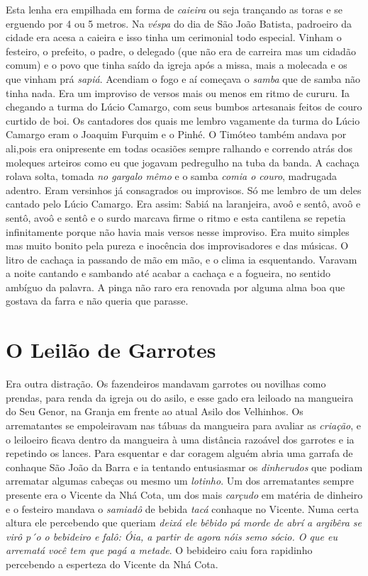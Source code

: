 \documentclass[12pt,brazil,]{book}
\begin{document}
Esta lenha era empilhada em forma de \emph{caieira} ou seja trançando as
toras e se erguendo por 4 ou 5 metros. Na \emph{véspa} do dia de São
João Batista, padroeiro da cidade era acesa a caieira e isso tinha um
cerimonial todo especial. Vinham o festeiro, o prefeito, o padre, o
delegado (que não era de carreira mas um cidadão comum) e o povo que
tinha saído da igreja após a missa, mais a molecada e os que vinham prá
\emph{sapiá}. Acendiam o fogo e aí começava o \emph{samba} que de samba
não tinha nada. Era um improviso de versos mais ou menos em ritmo de
cururu. Ia chegando a turma do Lúcio Camargo, com seus bumbos artesanais
feitos de couro curtido de boi. Os cantadores dos quais me lembro
vagamente da turma do Lúcio Camargo eram o Joaquim Furquim e o Pinhé. O
Timóteo também andava por ali,pois era onipresente em todas ocasiões
sempre ralhando e correndo atrás dos moleques arteiros como eu que
jogavam pedregulho na tuba da banda. A cachaça rolava solta, tomada
\emph{no gargalo mêmo} e o samba \emph{comia o couro}, madrugada
adentro. Eram versinhos já consagrados ou improvisos. Só me lembro de um
deles cantado pelo Lúcio Camargo. Era assim: Sabiá na laranjeira, avoô e
sentô, avoô e sentô, avoô e sentô e o surdo marcava firme o ritmo e esta
cantilena se repetia infinitamente porque não havia mais versos nesse
improviso. Era muito simples mas muito bonito pela pureza e inocência
dos improvisadores e das músicas. O litro de cachaça ia passando de mão
em mão, e o clima ia esquentando. Varavam a noite cantando e sambando
até acabar a cachaça e a fogueira, no sentido ambíguo da palavra. A
pinga não raro era renovada por alguma alma boa que gostava da farra e
não queria que parasse.

\section{O Leilão de Garrotes}\label{o-leiluxe3o-de-garrotes}

Era outra distração. Os fazendeiros mandavam garrotes ou novilhas como
prendas, para renda da igreja ou do asilo, e esse gado era leiloado na
mangueira do Seu Genor, na Granja em frente ao atual Asilo dos
Velhinhos. Os arrematantes se empoleiravam nas tábuas da mangueira para
avaliar as \emph{criação}, e o leiloeiro ficava dentro da mangueira à
uma distância razoável dos garrotes e ia repetindo os lances. Para
esquentar e dar coragem alguém abria uma garrafa de conhaque São João da
Barra e ia tentando entusiasmar os \emph{dinherudos} que podiam
arrematar algumas cabeças ou mesmo um \emph{lotinho}. Um dos
arrematantes sempre presente era o Vicente da Nhá Cota, um dos mais
\emph{carçudo} em matéria de dinheiro e o festeiro mandava o
\emph{samiadô} de bebida \emph{tacá} conhaque no Vicente. Numa certa
altura ele percebendo que queriam \emph{deixá ele bêbido pá morde de
abrí a argibêra se virô p´o o bebideiro e falô: Óia, a partir de agora
nóis semo sócio. O que eu arrematá você tem que pagá a metade}. O
bebideiro caiu fora rapidinho percebendo a esperteza do Vicente da Nhá
Cota.
\end{document}

